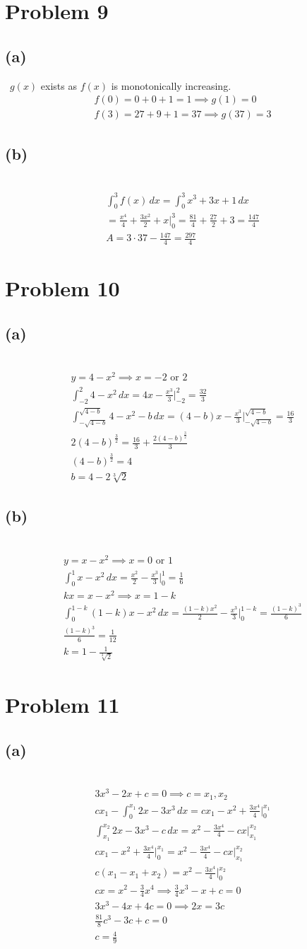 \documentclass[12pt]{article}
\newcommand*{\cbrt}[1]{\ensuremath{\sqrt[3]{#1}}}
\newcommand{\tor}{\text{ or }}
\newcommand{\problem}[1]{\section{Problem #1}}
\newcommand{\subproblem}[1]{\subsection{(#1)} \,}
\begin{document}
\problem{9}

\subproblem{a}
$g(x)$ exists as $f(x)$ is monotonically increasing.
\begin{gather*}
    f(0)=0+0+1=1 \implies g(1)=\boxed{0}\\
    f(3)=27+9+1=37 \implies g(37)=\boxed{3}
\end{gather*}

\subproblem{b}
\begin{gather*}
    \int_0^3 f(x)\, dx= \int_0^3 x^3+3x+1\, dx \\
    = \frac{x^4}{4}+\frac{3x^2}{2}+x\Big|^3_0 = \frac{81}{4}+\frac{27}{2}+3 = \frac{147}{4}\\
    A=3\cdot 37 - \frac{147}{4}=\boxed{\frac{297}{4}}
\end{gather*}

\problem{10}

\subproblem{a}
\begin{gather*}
    y=4-x^2 \implies x=-2\tor 2\\
    \int_{-2}^2 4-x^2\, dx = 4x-\frac{x^3}{3}\Big|_{-2}^2 = \frac{32}{3}\\
    \int_{-\sqrt{4-b}}^{\sqrt{4-b}} 4-x^2 -b\, dx =(4-b)x-\frac{x^3}{3}\Big|_{-\sqrt{4-b}}^{\sqrt{4-b}}=\frac{16}{3}\\
    2(4-b)^\frac{3}{2}=\frac{16}{3} + \frac{2(4-b)^\frac{3}{2}}{3}\\
    (4-b)^\frac{3}{2} = 4\\
    b=  \boxed{4-2\cbrt2}
\end{gather*}

\subproblem{b}
\begin{gather*}
    y=x-x^2 \implies x=0 \tor 1\\
    \int_{0}^{1} x - x^2 \, dx = \frac{x^2}{2} - \frac{x^3}{3} \Big|_{0}^{1} = \frac{1}{6}\\
    kx=x-x^2 \implies x=1-k\\
    \int_0^{1-k} (1-k)x-x^2\, dx = \frac{(1-k)x^2}{2}-\frac{x^3}{3}\Big|_0^{1-k}=\frac{(1-k)^3}{6}\\
    \frac{(1-k)^3}{6} = \frac{1}{12}\\
    k=\boxed{1-\frac{1}{\cbrt2}}
\end{gather*}

\problem{11}

\subproblem{a}
\begin{gather*}
    3x^3-2x+c=0 \implies c=x_1,x_2\\
    c x_1-\int_0^{x_1} 2x-3x^3\, dx = cx_1-x^2+\frac{3x^4}{4}\Big|_0^{x_1}\\
    \int_{x_1}^{x_2}2x-3x^3-c \, dx = x^2-\frac{3x^4}{4}-cx\Big|_{x_1}^{x_2}    \\
    cx_1-x^2+\frac{3x^4}{4}\Big|_0^{x_1} = x^2-\frac{3x^4}{4}-cx\Big|_{x_1}^{x_2} \\
    c(x_1-x_1+x_2)=x^2-\frac{3x^4}{4}\Big|_{0}^{x_2}\\
    cx=x^2-\frac{3}{4}x^4 \implies \frac{3}{4}x^3-x+c=0\\
    3x^3-4x+4c=0 \implies 2x=3c\\
    \frac{81}{8}c^3-3c+c=0 \\
    c=\boxed{\frac{4}{9}}
\end{gather*}
\end{document}
